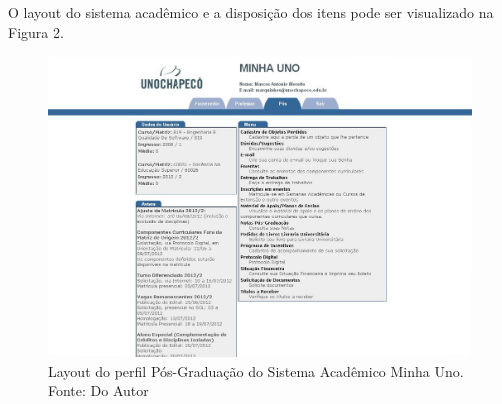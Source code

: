 O layout do sistema acadêmico e a disposição dos itens pode ser visualizado na Figura 2.

\begin{figure}[!htb]
     \centering
     \includegraphics[scale=0.3]{imagens/pos.jpg}
     \caption[Layout do Sistema - Perfil Pós-Graduação]{Layout do perfil Pós-Graduação do Sistema Acadêmico Minha Uno. Fonte: Do Autor}
\end{figure}

